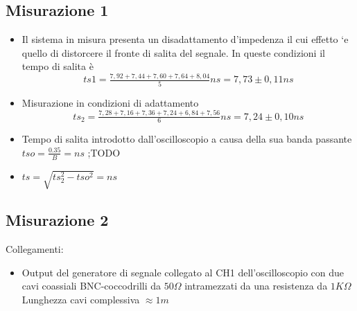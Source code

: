 \documentclass[a4paper]{article}
\begin{document}
\subsection{ Misurazione 1}
\begin{itemize}
\item Il sistema in misura presenta un disadattamento d’impedenza il cui effetto `e quello di distorcere il fronte di salita del segnale. In queste condizioni il tempo di salita è \[ts1 = \tfrac{7,92+7,44+7,60+7,64+8,04}{5}ns = 7,73 \pm 0,11 ns\]
\item Misurazione in condizioni di adattamento \[ts_2 = \tfrac{7,28+7,16+7,36+7,24+6,84+7,56}{6}ns = 7,24 \pm 0,10 ns\] 
\item Tempo di salita introdotto dall’oscilloscopio a causa della sua banda passante \(tso=\tfrac{0.35}{B} = ns\) ;TODO
\item \(ts= \sqrt{ts_2^2 -tso^2} = ns\)
\end{itemize}

\subsection{Misurazione 2}

Collegamenti:
\begin{itemize}
\item Output del generatore di segnale collegato al CH1 dell'oscilloscopio con due cavi coassiali BNC-coccodrilli da \(50 \Omega\) intramezzati da una resistenza da \(1 K\Omega\) \\
Lunghezza cavi complessiva \(\approx 1 m\) 
\end{itemize}
\end{document}
